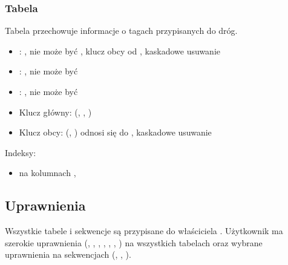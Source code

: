 \subsubsection{Tabela }
Tabela przechowuje informacje o tagach przypisanych do dróg.
\begin{itemize}
    \item {}: , nie może być , klucz obcy od , kaskadowe usuwanie
    \item {}: , nie może być 
    \item {}: , nie może być 
    \item Klucz główny: (, , )
    \item Klucz obcy: (, ) odnosi się do , kaskadowe usuwanie
\end{itemize}
Indeksy:
\begin{itemize}
    \item {} na kolumnach , 
\end{itemize}

\subsection{Uprawnienia}
Wszystkie tabele i sekwencje są przypisane do właściciela .
Użytkownik  ma szerokie uprawnienia (, , , , , , ) na wszystkich tabelach oraz wybrane uprawnienia na sekwencjach (, , ).
